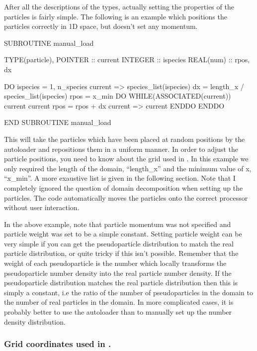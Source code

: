 After all the descriptions of the types, actually setting the properties of
the particles is fairly simple. The following is an example which positions
the particles correctly in 1D space, but doesn't set any momentum.
\begin{boxverbatim}
SUBROUTINE manual_load

  TYPE(particle), POINTER :: current
  INTEGER :: ispecies
  REAL(num) :: rpos, dx

  DO ispecies = 1, n_species
    current => species_list(ispecies)%
    dx = length_x / species_list(ispecies)%
    rpos = x_min
    DO WHILE(ASSOCIATED(current))
      current%
      current%
      rpos = rpos + dx
      current => current%
    ENDDO
  ENDDO

END SUBROUTINE manual_load
\end{boxverbatim}

This will take the particles which have been placed at random positions
by the autoloader and repositions them in a uniform manner. In order to
adjust the particle positions, you need to know about the grid used in
{\EPOCH}. In this example we only required the length of the domain,
``length\_x'' and the minimum value of x, ``x\_min''. A more exaustive
list is given in the following section. Note that
I completely ignored the question of domain decomposition when setting up the
particles. The code automatically moves the particles onto the correct
processor without user interaction.

In the above example, note that particle momentum was not specified and
particle weight was set to be a simple constant. Setting particle weight can
be very simple if you can get the pseudoparticle distribution to match the
real particle distribution, or quite tricky if this isn't possible. Remember
that the weight of each pseudoparticle is the number which locally transforms
the pseudoparticle number density into the real particle number density. If
the pseudoparticle distribution matches the real particle distribution then
this is simply a constant, i.e the ratio of the number of pseudoparticles in
the domain to the number of real particles in the domain. In more complicated
cases, it is probably better to use the autoloader than to manually set up the
number density distribution.

\subsubsection{Grid coordinates used in {\EPOCH}.}

